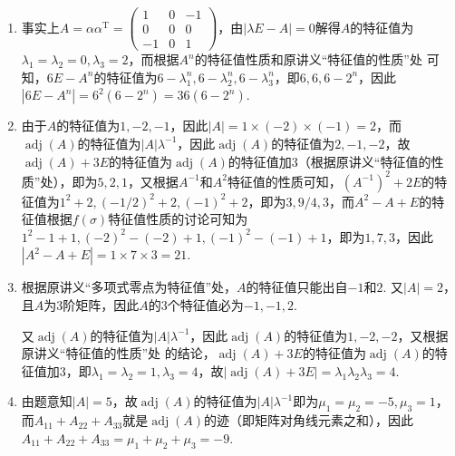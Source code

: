 \documentclass[UTF8,12pt,a4paper,fontset=fandol]{ctexart}
\begin{document}
\begin{solve}
\begin{enumerate}
        \item 事实上$A=\alpha\alpha^\mathrm{T}=\begin{pmatrix}
                      1 & 0 & -1 \\ 0 & 0 & 0 \\ -1 & 0 & 1
                  \end{pmatrix}$，由$|\lambda E-A|=0$解得$A$的特征值为$\lambda_1=\lambda_2=0,\lambda_3=2$，而根据$A^n$的特征值性质和原讲义“特征值的性质”处 可知，$6E-A^n$的特征值为$6-\lambda_1^n,6-\lambda_2^n,6-\lambda_3^n$，即$6,6,6-2^n$，因此$|6E-A^n|=6^2(6-2^n)=36(6-2^n)$.

        \item 由于$A$的特征值为$1,-2,-1$，因此$|A|=1\times(-2)\times(-1)=2$，而$\operatorname{adj}(A)$的特征值为$|A|\lambda^{-1}$，因此$\operatorname{adj}(A)$的特征值为$2,-1,-2$，故$\operatorname{adj}(A)+3E$的特征值为$\operatorname{adj}(A)$的特征值加3（根据原讲义“特征值的性质”处），即为$5,2,1$，又根据$A^{-1}$和$A^2$特征值的性质可知，$(A^{-1})^2+2E$的特征值为$1^2+2,(-1/2)^2+2,(-1)^2+2$，即为$3,9/4,3$，而$A^2-A+E$的特征值根据$f(\sigma)$特征值性质的讨论可知为$1^2-1+1,(-2)^2-(-2)+1,(-1)^2-(-1)+1$，即为$1,7,3$，因此$|A^2-A+E|=1\times 7\times 3=21$.

        \item 根据原讲义“多项式零点为特征值”处，$A$的特征值只能出自$-1$和$2$. 又$|A|=2$，且$A$为3阶矩阵，因此$A$的3个特征值必为$-1,-1,2$.

              又$\operatorname{adj}(A)$的特征值为$|A|\lambda^{-1}$，因此$\operatorname{adj}(A)$的特征值为$1,-2,-2$，又根据原讲义“特征值的性质”处 的结论，$\operatorname{adj}(A)+3E$的特征值为$\operatorname{adj}(A)$的特征值加3，即$\lambda_1=\lambda_2=1,\lambda_3=4$，故$|\operatorname{adj}(A)+3E|=\lambda_1\lambda_2\lambda_3=4$.

        \item 由题意知$|A|=5$，故$\operatorname{adj}(A)$的特征值为$|A|\lambda^{-1}$即为$\mu_1=\mu_2=-5,\mu_3=1$，而$A_{11}+A_{22}+A_{33}$就是$\operatorname{adj}(A)$的迹（即矩阵对角线元素之和），因此$A_{11}+A_{22}+A_{33}=\mu_1+\mu_2+\mu_3=-9$.
    \end{enumerate}
\end{solve}
\end{document}
